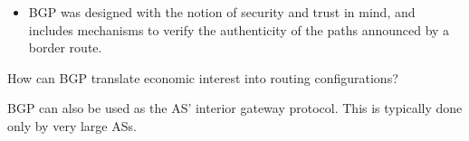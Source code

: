 \begin{itemize}
\begin{itemize}
\item BGP was designed with the notion of security and trust in mind, and includes mechanisms
to verify the authenticity of the paths announced by a border route.
\end{itemize}

\begin{exercise}
How can BGP translate economic interest into routing configurations?
\end{exercise}

\end{itemize}

\begin{remark}
BGP can also be used as the AS' interior gateway protocol. 
This is typically done only by very large ASs.
\end{remark}

% 
% 

